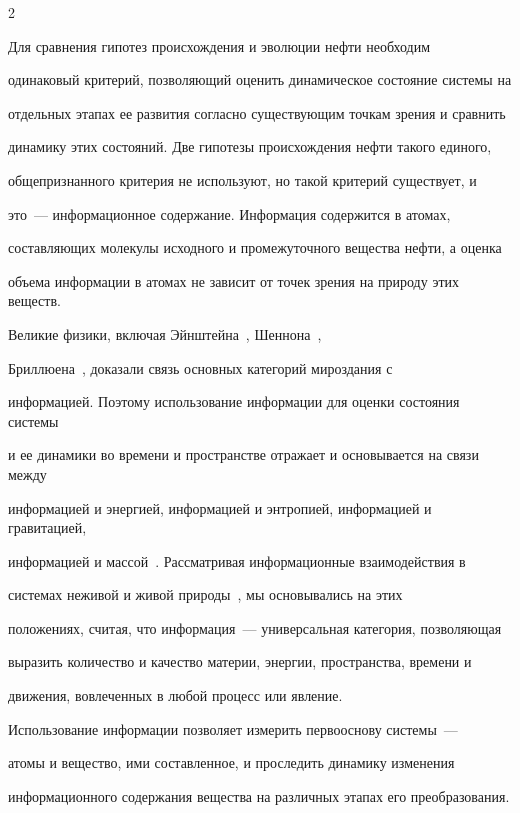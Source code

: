 \begin{multicols}{2}
     

     Для сравнения гипотез происхождения и эволюции нефти необходим 

одинаковый критерий, позволяющий оценить динамическое состояние сис\-те\-мы на 

отдельных этапах ее развития согласно существующим точкам зрения и сравнить 

динамику этих состояний. Две гипотезы происхождения нефти такого единого, 

общепризнанного критерия не используют, но такой критерий существует, и 

     это~--- информационное содержание. Информация содержится в атомах, 

составляющих молекулы исходного и промежуточного вещества нефти, а оценка 

объема информации в атомах не зависит от точек зрения на природу этих веществ.

     

     Великие физики, включая Эйнштейна~\cite{29s}, Шеннона~\cite{27s}, 

Бриллюена~\cite{5s}, доказали связь основных категорий мироздания с 

информацией. Поэтому использование информации для оценки состояния системы 

и ее динамики во времени и пространстве отражает и основывается на связи между 

информацией и энергией, информацией и энтропией, информацией и гравитацией, 

ин\-форма\-ци\-ей и массой~\cite{7s}. Рассматривая информационные взаимодействия в 

системах неживой и живой природы~\cite{20s}, мы основывались на этих 

положениях, считая, что информация~--- универсальная категория, позволяющая 

выразить количество и качество материи, энергии, пространства, времени и 

движения, вовлеченных в любой процесс или явление.

     

     Использование информации позволяет измерить первооснову системы~--- 

атомы и вещество, ими составленное, и проследить динамику изменения 

информационного содержания вещества на различных этапах его преобразования. 

     


\end{multicols}
